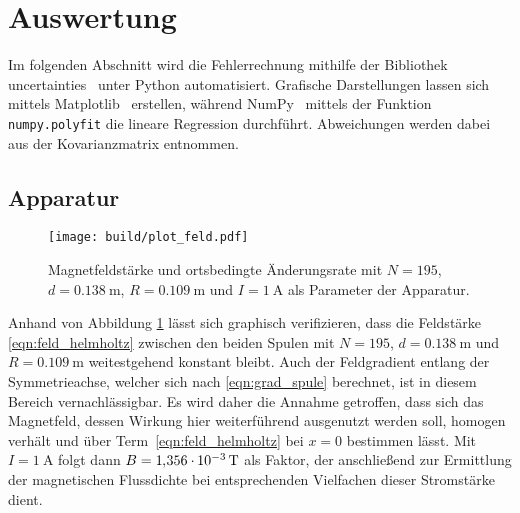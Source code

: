 \section{Auswertung}
\label{sec:auswertung}

Im folgenden Abschnitt wird die Fehlerrechnung mithilfe der Bibliothek uncertainties~\cite{uncertainties} unter Python
\cite{python} automatisiert. Grafische Darstellungen lassen sich mittels Matplotlib~\cite{matplotlib} erstellen, während
NumPy~\cite{numpy} mittels der Funktion \verb+numpy.polyfit+ die lineare Regression durchführt. Abweichungen werden
dabei aus der Kovarianzmatrix entnommen.

\subsection{Apparatur}

\begin{figure}[H]
	\vspace{-1em}
	\texttt{[image: build/plot\_feld.pdf]}
	\vspace{-4ex}
	\captionsetup{width=0.86\linewidth}
	\caption{Magnetfeldstärke und ortsbedingte Änderungsrate mit $N = \num{195}$, \newline
			 $d = \qty{0.138}{\meter}$, $R = \qty{0.109}{\meter}$ und $I = \qty{1}{\ampere}$ als Parameter der Apparatur.}
	\label{fig:feld}
\end{figure}

Anhand von Abbildung \ref{fig:feld} lässt sich graphisch verifizieren, dass die Feldstärke \eqref{eqn:feld_helmholtz} zwischen
den beiden Spulen mit $N = \num{195}$, $d = \qty{0.138}{\meter}$ und $R = \qty{0.109}{\meter}$ weitestgehend konstant bleibt.
Auch der Feldgradient entlang der Symmetrieachse, welcher sich nach \eqref{eqn:grad_spule} berechnet, ist in diesem
Bereich vernachlässigbar. Es wird daher die Annahme getroffen, dass sich das Magnetfeld, dessen Wirkung hier weiterführend
ausgenutzt werden soll, homogen verhält und über Term~\eqref{eqn:feld_helmholtz} bei $x = 0$ bestimmen lässt. Mit
$I = \qty{1}{\ampere}$ folgt dann $B = 1\hspace{-0.1ex},\hspace{-0.3ex}356 \cdot\hspace{-0.1ex} \qty{e-3}{\tesla}$ als
Faktor, der anschließend zur Ermittlung der magnetischen Flussdichte bei entsprechenden Vielfachen dieser Stromstärke dient.


